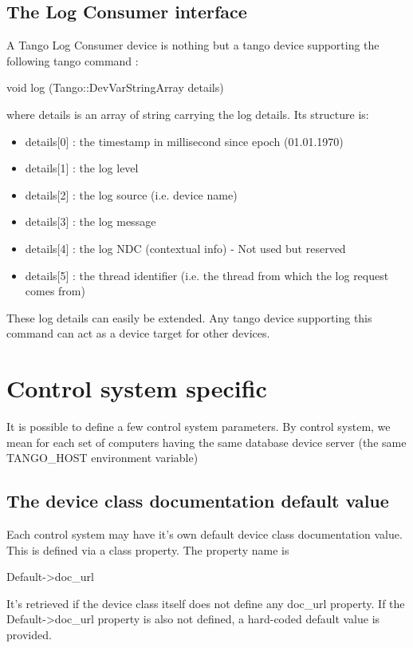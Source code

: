 \subsection{The Log Consumer interface}

A Tango Log Consumer device is nothing but a tango device supporting
the following tango command : \begin{center}void log (Tango::DevVarStringArray
details)\end{center} where details is an array of string carrying
the log details. Its structure is:
\begin{itemize}
\item details{[}0{]} : the timestamp in millisecond since epoch (01.01.1970) 
\item details{[}1{]} : the log level
\item details{[}2{]} : the log source (i.e. device name)
\item details{[}3{]} : the log message
\item details{[}4{]} : the log NDC (contextual info) - Not used but reserved
\item details{[}5{]} : the thread identifier (i.e. the thread from which
the log request comes from)
\end{itemize}
These log details can easily be extended. Any tango device supporting
this command can act as a device target for other devices. 

\section{Control system specific}

It is possible to define a few control system parameters. By control
system, we mean for each set of computers having the same database
device server (the same TANGO\_HOST environment variable)

\subsection{The device class documentation default value}

Each control system may have it's own default device class documentation
value. This is defined via a class property. The property name is
\begin{center}Default->doc\_url\end{center} It's retrieved if the
device class itself does not define any doc\_url property. If the
Default->doc\_url property is also not defined, a hard-coded default
value is provided.

